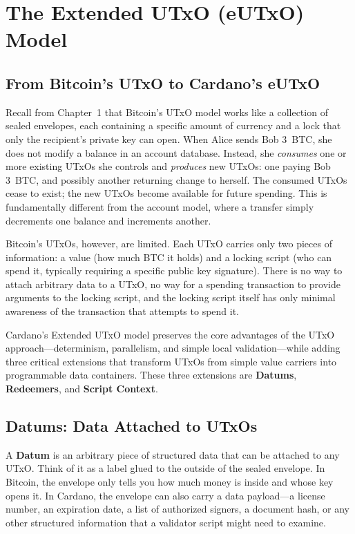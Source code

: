 \section{The Extended UTxO (eUTxO) Model}
\label{sec:eutxo}

\subsection{From Bitcoin's UTxO to Cardano's eUTxO}

Recall from Chapter~1 that Bitcoin's UTxO model works like a collection
of sealed envelopes, each containing a specific amount of currency and a
lock that only the recipient's private key can open. When Alice sends Bob
3~BTC, she does not modify a balance in an account database. Instead, she
\emph{consumes} one or more existing UTxOs she controls and
\emph{produces} new UTxOs: one paying Bob 3~BTC, and possibly another
returning change to herself. The consumed UTxOs cease to exist; the new
UTxOs become available for future spending. This is fundamentally
different from the account model, where a transfer simply decrements
one balance and increments another.

Bitcoin's UTxOs, however, are limited. Each UTxO carries only two pieces
of information: a value (how much BTC it holds) and a locking script
(who can spend it, typically requiring a specific public key signature).
There is no way to attach arbitrary data to a UTxO, no way for a
spending transaction to provide arguments to the locking script, and the
locking script itself has only minimal awareness of the transaction that
attempts to spend it.

Cardano's Extended UTxO model preserves the core advantages of the UTxO
approach---determinism, parallelism, and simple local validation---while
adding three critical extensions that transform UTxOs from simple value
carriers into programmable data containers. These three extensions are
\textbf{Datums}, \textbf{Redeemers}, and \textbf{Script Context}.

\subsection{Datums: Data Attached to UTxOs}

A \textbf{Datum} is an arbitrary piece of structured data that can be
attached to any UTxO. Think of it as a label glued to the outside of the
sealed envelope. In Bitcoin, the envelope only tells you how much money
is inside and whose key opens it. In Cardano, the envelope can also
carry a data payload---a license number, an expiration date, a list of
authorized signers, a document hash, or any other structured information
that a validator script might need to examine.

